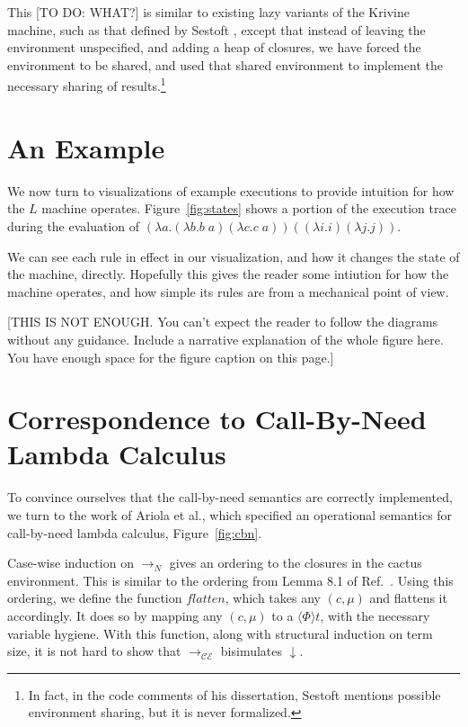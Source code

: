 \documentclass[preprint]{sigplanconf}
\begin{document}
This [TO DO: WHAT?] is similar to existing lazy variants of the Krivine machine, such as that
defined by Sestoft \cite{sestoft}, except that instead of leaving the
environment unspecified, and adding a heap of closures, we have forced the
environment to be shared, and used that shared environment to implement the
necessary sharing of results.\footnote{In fact, in the code comments of his
dissertation, Sestoft mentions possible environment sharing, but it is never
formalized.} 

\section{An Example}

We now turn to 
visualizations of example executions to provide intuition for how the $L$
machine operates. Figure~\ref{fig:states} shows a portion
of the execution trace during the evaluation of $(\lambda a.(\lambda b.b \; a)
(\lambda c.c \; a)) ((\lambda i.i) (\lambda j.j))$. 



We can see each rule in effect in our visualization, and how it changes the
state of the machine, directly. Hopefully this gives the reader some intiution
for how the machine operates, and how simple its rules are from a mechanical
point of view. 

[THIS IS NOT ENOUGH. You can't expect the reader to follow the diagrams
without any guidance. Include a narrative explanation of the whole figure here. You have enough
space for the figure caption on this page.]

\section{Correspondence to Call-By-Need Lambda Calculus}
To convince ourselves that the call-by-need
semantics are correctly implemented, we turn to the work of
Ariola et al.\cite{ariola1995call}, which specified an operational semantics for
call-by-need lambda calculus, Figure~\ref{fig:cbn}.



Case-wise induction on $\rightarrow_{N}$ gives an ordering to the closures
in the cactus environment. This is similar to the ordering from Lemma 8.1 of
Ref.~\cite{ariola1995call}.
Using this ordering, we define the function $flatten$, which takes any $(c, \mu)$
and flattens it accordingly. It does so by mapping any $(c, \mu)$ to a $\langle
\Phi \rangle t$, with the necessary variable hygiene. With this function, along
with structural induction on term size, it is not hard to show that
$\rightarrow_{\mathcal{CE}}$ bisimulates $\downarrow$.
\end{document}
